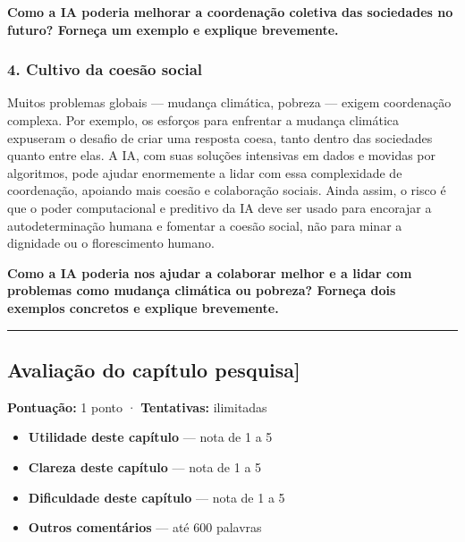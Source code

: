 \documentclass[
  11pt,
]{article}
\providecommand{\tightlist}{%
  \setlength{\itemsep}{0pt}\setlength{\parskip}{0pt}}
\renewcommand{\texttt}[1]{{\color{iaAmeixa}\small\ttfamily #1}}
\renewenvironment{quote}
  {\begin{tcolorbox}[
      breakable, enhanced jigsaw, rounded corners,
      arc=3pt, boxrule=0pt, frame hidden,
      colback=iaCaso,
      borderline west={3pt}{0pt}{iaRiscos},
      left=12pt, right=10pt, top=9pt, bottom=9pt,
      before skip=9pt, after skip=9pt]}
  {\end{tcolorbox}}
\begin{document}
\begin{quote}
\textbf{Como a IA poderia melhorar a coordenação coletiva das sociedades
no futuro? Forneça um exemplo e explique brevemente.}
\end{quote}

\hypertarget{cultivo-da-coesuxe3o-social}{%
\subsubsection{4. Cultivo da coesão
social}\label{cultivo-da-coesuxe3o-social}}

Muitos problemas globais --- mudança climática, pobreza --- exigem
coordenação complexa. Por exemplo, os esforços para enfrentar a mudança
climática expuseram o desafio de criar uma resposta coesa, tanto dentro
das sociedades quanto entre elas. A IA, com suas soluções intensivas em
dados e movidas por algoritmos, pode ajudar enormemente a lidar com essa
complexidade de coordenação, apoiando mais coesão e colaboração sociais.
Ainda assim, o risco é que o poder computacional e preditivo da IA deve
ser usado para encorajar a autodeterminação humana e fomentar a coesão
social, não para minar a dignidade ou o florescimento humano.

\begin{quote}
\textbf{Como a IA poderia nos ajudar a colaborar melhor e a lidar com
problemas como mudança climática ou pobreza? Forneça dois exemplos
concretos e explique brevemente.}
\end{quote}

\begin{center}\rule{0.5\linewidth}{0.5pt}\end{center}

\hypertarget{avaliauxe7uxe3o-do-capuxedtulo-pesquisa}{%
\subsection{\texorpdfstring{Avaliação do capítulo
\texttt{{[}pesquisa{]}}}{Avaliação do capítulo {[}pesquisa{]}}}\label{avaliauxe7uxe3o-do-capuxedtulo-pesquisa}}

\textbf{Pontuação:} 1 ponto · \textbf{Tentativas:} ilimitadas

\begin{itemize}
\tightlist
\item
  \textbf{Utilidade deste capítulo} --- nota de 1 a 5
\item
  \textbf{Clareza deste capítulo} --- nota de 1 a 5
\item
  \textbf{Dificuldade deste capítulo} --- nota de 1 a 5
\item
  \textbf{Outros comentários} --- até 600 palavras
\end{itemize}
\end{document}
